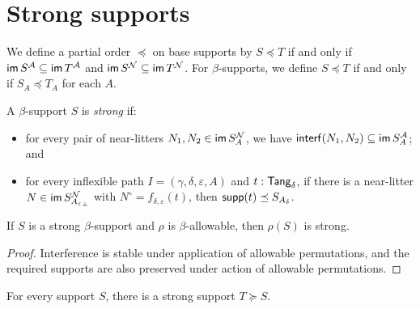 \section{Strong supports}
\begin{definition}
  \label{def:StrSupport.Occurs}
  We define a partial order \( \preceq \) on base supports by \( S \preceq T \) if and only if \( \operatorname{\mathsf{im}} S^{\mathcal A} \subseteq \operatorname{\mathsf{im}} T^{\mathcal A} \) and \( \operatorname{\mathsf{im}} S^{\mathcal N} \subseteq \operatorname{\mathsf{im}} T^{\mathcal N} \).
  For \( \beta \)-supports, we define \( S \preceq T \) if and only if \( S_A \preceq T_A \) for each \( A \).
\end{definition}
\begin{definition}
  \label{def:Strong}
  A \( \beta \)-support \( S \) is \emph{strong} if:
  \begin{itemize}
    \item for every pair of near-litters \( N_1, N_2 \in \operatorname{\mathsf{im}} S_A^{\mathcal N} \), we have \( \operatorname{\mathsf{interf}}(N_1, N_2) \subseteq \operatorname{\mathsf{im}} S_A^{\mathcal A} \); and
    \item for every inflexible path \( I = (\gamma,\delta,\varepsilon,A) \) and \( t : \mathsf{Tang}_\delta \), if there is a near-litter \( N \in \operatorname{\mathsf{im}} S_{{A_\varepsilon}_\bot}^{\mathcal N} \) with \( N^\circ = f_{\delta,\varepsilon}(t) \), then \( \operatorname{\mathsf{supp}}(t) \preceq S_{A_\delta} \).
  \end{itemize}
\end{definition}
\begin{proposition}
  \label{prop:Strong.smul}
  If \( S \) is a strong \( \beta \)-support and \( \rho \) is \( \beta \)-allowable, then \( \rho(S) \) is strong.
\end{proposition}
\begin{proof}
  Interference is stable under application of allowable permutations, and the required supports are also preserved under action of allowable permutations.
\end{proof}
\begin{proposition}
  \label{prop:exists_strong}
  For every support \( S \), there is a strong support \( T \succeq S \).
\end{proposition}
